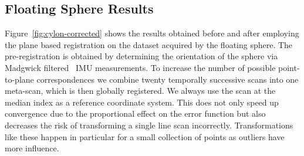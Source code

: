 \documentclass[5p]{elsarticle}
\begin{document}
\subsection{Floating Sphere Results}

Figure~\ref{fig:cylon-corrected} shows the results obtained before and after employing the plane based registration on the dataset acquired by the floating sphere.
The pre-registration is obtained by determining the orientation of the sphere via Madgwick filtered~\cite{madgwick2010efficient} IMU measurements.
To increase the number of possible point-to-plane correspondences we combine twenty temporally successive scans into one meta-scan, which is then globally registered. 
We always use the scan at the median index as a reference coordinate system.
This does not only speed up convergence due to the proportional effect on the error function but also decreases the risk of transforming a single line scan incorrectly.
Transformations like these happen in particular for a small collection of points as outliers have more influence.
\end{document}
